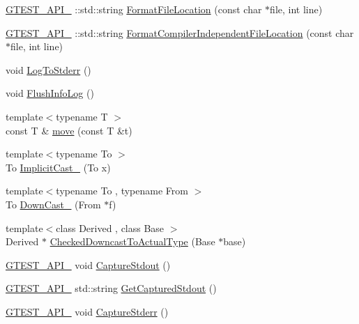 \begin{DoxyCompactItemize}
\item 
\hyperlink{gtest-port_8h_aa73be6f0ba4a7456180a94904ce17790}{G\+T\+E\+S\+T\+\_\+\+A\+P\+I\+\_\+} \+::std\+::string \hyperlink{namespacetesting_1_1internal_a31b7c3abed4a7c395f42c61e993989f4}{Format\+File\+Location} (const char $\ast$file, int line)
\item 
\hyperlink{gtest-port_8h_aa73be6f0ba4a7456180a94904ce17790}{G\+T\+E\+S\+T\+\_\+\+A\+P\+I\+\_\+} \+::std\+::string \hyperlink{namespacetesting_1_1internal_a1ee4cde97868c53e442d3182496a9f3c}{Format\+Compiler\+Independent\+File\+Location} (const char $\ast$file, int line)
\item 
void \hyperlink{namespacetesting_1_1internal_a06b1b20029fbd1dbeb59752f914fab84}{Log\+To\+Stderr} ()
\item 
void \hyperlink{namespacetesting_1_1internal_a2135f223bf6b527729aeaa651115183b}{Flush\+Info\+Log} ()
\item 
{\footnotesize template$<$typename T $>$ }\\const T \& \hyperlink{namespacetesting_1_1internal_a0f6d06bf8c3093b9c22bb08723db201e}{move} (const T \&t)
\item 
{\footnotesize template$<$typename To $>$ }\\To \hyperlink{namespacetesting_1_1internal_a982df3f369643b175f79cda4048bc3b9}{Implicit\+Cast\+\_\+} (To x)
\item 
{\footnotesize template$<$typename To , typename From $>$ }\\To \hyperlink{namespacetesting_1_1internal_a1a1a1aed3fe00908b8a45d5ab4a33665}{Down\+Cast\+\_\+} (From $\ast$f)
\item 
{\footnotesize template$<$class Derived , class Base $>$ }\\Derived $\ast$ \hyperlink{namespacetesting_1_1internal_abfe9bfb020d38aa4e0e12c001911b22b}{Checked\+Downcast\+To\+Actual\+Type} (Base $\ast$base)
\item 
\hyperlink{gtest-port_8h_aa73be6f0ba4a7456180a94904ce17790}{G\+T\+E\+S\+T\+\_\+\+A\+P\+I\+\_\+} void \hyperlink{namespacetesting_1_1internal_acba06d4f0343dec407738ba5544af990}{Capture\+Stdout} ()
\item 
\hyperlink{gtest-port_8h_aa73be6f0ba4a7456180a94904ce17790}{G\+T\+E\+S\+T\+\_\+\+A\+P\+I\+\_\+} std\+::string \hyperlink{namespacetesting_1_1internal_aed657219a9856a8d249a3230de0c54ce}{Get\+Captured\+Stdout} ()
\item 
\hyperlink{gtest-port_8h_aa73be6f0ba4a7456180a94904ce17790}{G\+T\+E\+S\+T\+\_\+\+A\+P\+I\+\_\+} void \hyperlink{namespacetesting_1_1internal_a8ec00d458d0d442bd64af7b5f9c22dda}{Capture\+Stderr} ()

\end{DoxyCompactItemize}
